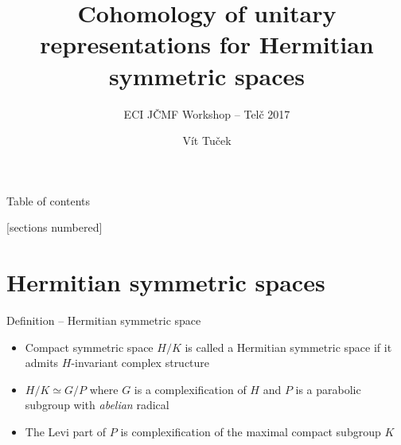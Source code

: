 \documentclass[10pt]{beamer}
\title{Cohomology of unitary representations for Hermitian symmetric spaces}
\subtitle{ECI \et JČMF Workshop -- Telč 2017}
\date{}
\author{Vít Tuček}
\institute{Mathematical Institute of Charles University}
\begin{document}

\maketitle


\begin{frame}{Table of contents}

[sections numbered]

\tableofcontents[hideallsubsections]

\end{frame}










\section{Hermitian symmetric spaces}


\begin{frame}{Definition -- Hermitian symmetric space}

\begin{itemize}%
\item Compact symmetric space $H/K$ is called a Hermitian symmetric space if it admits $H$-invariant complex structure
\item $H/K \simeq G/P$ where $G$ is a complexification of $H$ and $P$ is a parabolic subgroup with \emph{abelian} radical
\item The Levi part of $P$ is complexification of the maximal compact subgroup $K$
\end{itemize}

\end{frame}
\end{document}
